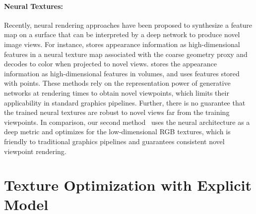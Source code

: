 \paragraph*{Neural Textures:}
Recently, neural rendering approaches have been proposed to synthesize a feature map on a surface that can be interpreted by a deep network to produce novel image views.  For instance, \cite{thies2019deferred} stores appearance information as high-dimensional features in a neural texture map associated with the coarse geometry proxy and decodes to color when projected to novel views.  \cite{sitzmann2019deepvoxels} stores the appearance information as high-dimensional features in volumes, and \cite{aliev2019neural} uses features stored with points. These methods rely on the representation power of generative networks at rendering times to obtain novel viewpoints, which limits their applicability in standard graphics pipelines. Further, there is no guarantee that the trained neural textures are robust to novel views far from the training viewpoints. In comparison, our second method~\cite{huang2020adversarial} uses the neural architecture as a deep metric and optimizes for the low-dimensional RGB textures, which is friendly to traditional graphics pipelines and guarantees consistent novel viewpoint rendering.


\section{Texture Optimization with Explicit Model}
\label{sec:toptim}

